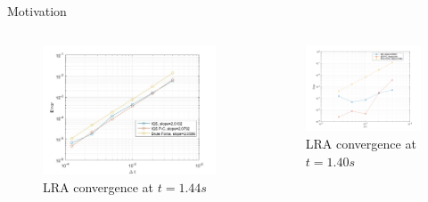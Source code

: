 \documentclass[8pt,xcolor=dvipnames]{beamer}
\begin{document}
\begin{frame}{Motivation}

\begin{columns}

\begin{figure}
\caption{LRA convergence at $t=1.44s$}
\includegraphics[width=\linewidth]{figures/lra_bad.jpg}
\end{figure}

\begin{figure}
\caption{LRA convergence at $t=1.40s$}
\includegraphics[width=\linewidth]{figures/lra_good.png}
\end{figure}

\end{columns}

\end{frame}
\end{document}
